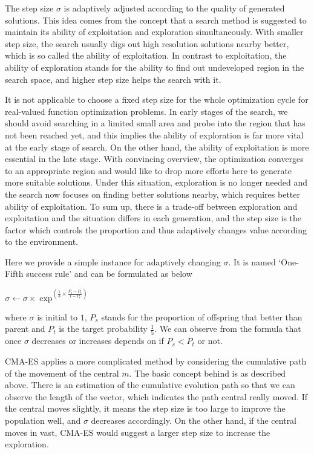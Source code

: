 The step size $\sigma$ is adaptively adjusted according to the quality
of generated solutions.  This idea comes from the concept that a search
method is suggested to maintain its ability of exploitation and
exploration simultaneously.  With smaller step size, the search usually
digs out high resolution solutions nearby better, which is so called the
ability of exploitation.  In contrast to exploitation, the ability of
exploration stands for the ability to find out undeveloped region in the
search space, and higher step size helps the search with it.

It is not applicable to choose a fixed step size for the whole
optimization cycle for real-valued function optimization problems.  In
early stages of the search, we should avoid searching in a limited small
area and probe into the region that has not been reached yet, and this
implies the ability of exploration is far more vital at the early stage
of search.  On the other hand, the ability of exploitation is more
essential in the late stage.  With convincing overview, the optimization
converges to an appropriate region and would like to drop more efforts
here to generate more suitable solutions.  Under this situation,
exploration is no longer needed and the search now focuses on finding
better solutions nearby, which requires better ability of exploitation.
To sum up, there is a trade-off between exploration and exploitation and
the situation differs in each generation, and the step size is the
factor which controls the proportion and thus adaptively changes value
according to the environment.

Here we provide a simple instance for adaptively changing $\sigma$.  It
is named `One-Fifth success rule' and can be formulated as below

\begin{center} {\Large $\sigma \leftarrow \sigma \times \exp^{\left(
    \frac{1}{3} \times \frac{P_s-P_t}{1-P_t} \right)}$}\\ \end{center}
  where $\sigma$ is initial to $1$, $P_s$ stands for the proportion of
  offspring that better than parent and $P_t$ is the target probability
  $\frac{1}{5}$.  We can observe from the formula that once $\sigma$
  decreases or increases depends on if $P_s < P_t$ or not.

  CMA-ES applies a more complicated method by considering the cumulative
  path of the movement of the central $m$.  The basic concept behind is
  as described above.  There is an estimation of the cumulative
  evolution path so that we can observe the length of the vector, which
  indicates the path central really moved.  If the central moves
  slightly, it means the step size is too large to improve the
  population well, and $\sigma$ decreases accordingly.  On the other
  hand, if the central moves in vast, CMA-ES would suggest a larger step
  size to increase the exploration.

